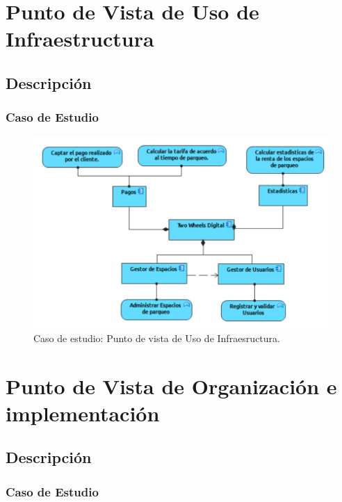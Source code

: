\section{Punto de Vista de Uso de Infraestructura}
\subsection{Descripción}


\subsubsection{Caso de Estudio}


\begin{figure}[H]
	\centering
	\includegraphics[width=1.0\textwidth]{imagenes/Caso_Estudio/Tecnologia/ComAplicacion.PDF}
	\caption{Caso de estudio: Punto de vista de Uso de Infraesructura.}
	\label{fig:gap_analysis}
\end{figure}


\section{Punto de Vista de Organización e implementación}
\subsection{Descripción}


\subsubsection{Caso de Estudio}


